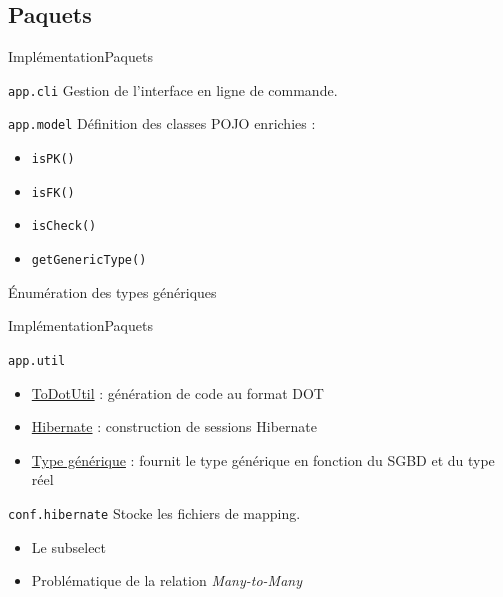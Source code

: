\subsection{Paquets}
\begin{frame}{Implémentation}{Paquets}
	\begin{block}{\texttt{app.cli}}
	Gestion de l'interface en ligne de commande.
	\end{block}
	\begin{block}{\texttt{app.model}}
	Définition des classes POJO enrichies :
	\begin{itemize}
	\item \texttt{isPK()}
	\item \texttt{isFK()}
	\item \texttt{isCheck()}
	\item \texttt{getGenericType()}
	\end{itemize}
	Énumération des types génériques
	\end{block}
\end{frame}

\begin{frame}{Implémentation}{Paquets}
	\begin{block}{\texttt{app.util}}
	\begin{itemize}
		\item \underline{ToDotUtil} : génération de code au format DOT
		\item \underline{Hibernate} : construction de sessions Hibernate
		\item \underline{Type générique} : fournit le type générique en fonction du SGBD et du type réel
	\end{itemize}
	\end{block}
	
	\begin{block}{\texttt{conf.hibernate}}
	Stocke les fichiers de mapping.
	\begin{itemize}
		\item Le subselect
		\item Problématique de la relation \textit{Many-to-Many}
	\end{itemize}
	\end{block}
\end{frame}

